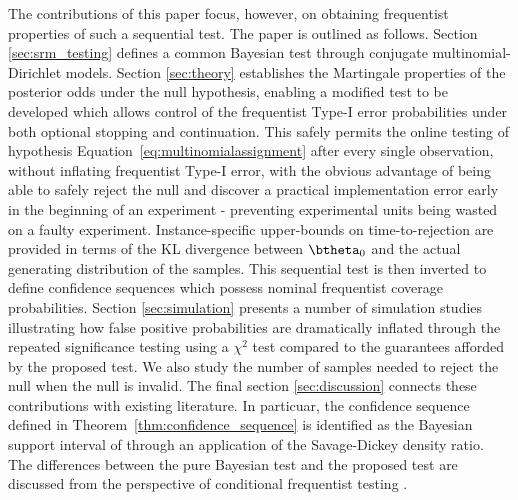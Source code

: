 \documentclass[11pt]{article}
\begin{document}
The contributions of this paper focus, however, on obtaining frequentist properties of such a sequential test.
The paper is outlined as follows.
Section \ref{sec:srm_testing} defines a common Bayesian test through conjugate multinomial-Dirichlet models.
Section \ref{sec:theory} establishes the Martingale properties of the posterior odds under the null hypothesis, enabling a modified test to be developed which allows control of the frequentist Type-I error probabilities under both optional stopping and continuation.
This safely permits the online testing of hypothesis Equation~\ref{eq:multinomialassignment} after every single observation, without inflating frequentist Type-I error, with the obvious advantage of being able to safely reject the null and discover a practical implementation error early in the beginning of an experiment - preventing experimental units being wasted on a faulty experiment.
Instance-specific upper-bounds on time-to-rejection are provided in terms of the KL divergence  between $\btheta_0$ and the actual generating distribution of the samples.
This sequential test is then inverted to define confidence sequences which possess nominal frequentist coverage probabilities.
Section \ref{sec:simulation} presents a number of simulation studies illustrating how false positive probabilities are dramatically inflated through the repeated significance testing using a $\chi^2$ test compared to the guarantees afforded by the proposed test.
We also study the number of samples needed to reject the null when the null is invalid.
The final section \ref{sec:discussion} connects these contributions with existing literature.
In particuar, the confidence sequence defined in Theorem~\ref{thm:confidence_sequence} is identified as the Bayesian support interval of \cite{support_interval} through an application of the Savage-Dickey density ratio.
The differences between the pure Bayesian test and the proposed test are discussed from the perspective of conditional frequentist testing \citep{conditional_frequentist_simple, conditional_frequentist_precise, conditional_frequentist_composite}.
\end{document}
